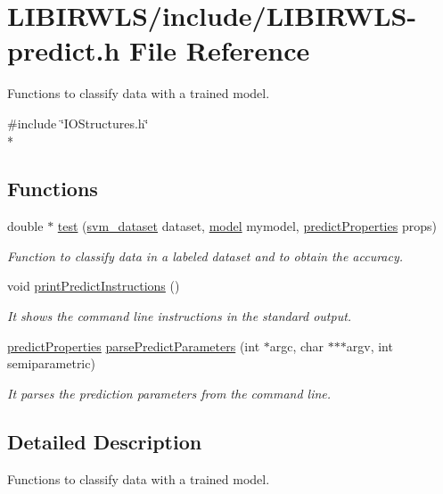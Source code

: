 \hypertarget{LIBIRWLS-predict_8h}{}\section{L\+I\+B\+I\+R\+W\+L\+S/include/\+L\+I\+B\+I\+R\+W\+L\+S-\/predict.h File Reference}
\label{LIBIRWLS-predict_8h}


Functions to classify data with a trained model.  


{\ttfamily \#include \char`\"{}I\+O\+Structures.\+h\char`\"{}}\\*
\subsection*{Functions}
\begin{DoxyCompactItemize}
\item 
double $\ast$ \hyperlink{LIBIRWLS-predict_8h_ae3fc6988def0487bb4bb47b759ba3d0b}{test} (\hyperlink{structsvm__dataset}{svm\+\_\+dataset} dataset, \hyperlink{structmodel}{model} mymodel, \hyperlink{structpredictProperties}{predict\+Properties} props)
\begin{DoxyCompactList}\small\item\em Function to classify data in a labeled dataset and to obtain the accuracy. \end{DoxyCompactList}\item 
void \hyperlink{LIBIRWLS-predict_8h_a53efcb64ca8e76d4a2cb65991189af91}{print\+Predict\+Instructions} ()
\begin{DoxyCompactList}\small\item\em It shows the command line instructions in the standard output. \end{DoxyCompactList}\item 
\hyperlink{structpredictProperties}{predict\+Properties} \hyperlink{LIBIRWLS-predict_8h_ad053dd367164b4b4b39a8f4ce31fe97f}{parse\+Predict\+Parameters} (int $\ast$argc, char $\ast$$\ast$$\ast$argv, int semiparametric)
\begin{DoxyCompactList}\small\item\em It parses the prediction parameters from the command line. \end{DoxyCompactList}\end{DoxyCompactItemize}


\subsection{Detailed Description}
Functions to classify data with a trained model. 

